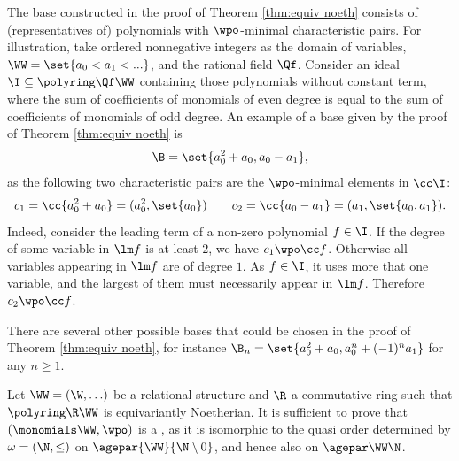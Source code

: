 \begin{slexample} \label{ex:Hilb-thm}
The base constructed in the proof of Theorem \ref{thm:equiv noeth} consists of 
(representatives of) polynomials with $\wpo$-minimal characteristic pairs.
For illustration, 
take ordered nonnegative integers as the domain of variables, $\WW = \set{a_0 < a_1 < ...}$, 
and the rational field $\Qf$. 
Consider an ideal $\I \subseteq \polyring \Qf \WW$ containing those polynomials 
   without constant term, where the sum of coefficients of monomials of even degree 
   is equal to the sum of coefficients of monomials of odd degree.
   An example of a base given by the proof of Theorem \ref{thm:equiv noeth}  is 
   \begin{align*}%
   \B=\set{a_0^2 + a_0, a_0 - a_1},
   \end{align*}
   as the following two characteristic pairs    are the $\wpo$-minimal elements in $\cc \I$:
   \[
   c_1 = \cc{a_0^2 + a_0} = (a_0^2, \set{a_0})  \qquad c_2 = \cc{a_0 - a_1} = (a_1, \set{a_0, a_1}).
   \]
   Indeed, consider the leading term of a non-zero polynomial $f\in \I$.
   If the degree of some variable in $\lm f$ is at least $2$, we have $c_1 \wpo \cc f$.
   Otherwise all variables appearing in $\lm f$ are of degree $1$.
   As $f\in\I$, it uses more that one variable, and the largest of them must necessarily appear 
   in $\lm f$.
   Therefore $c_2 \wpo \cc f$.
   
   There are several other possible bases that could be chosen in the proof of Theorem \ref{thm:equiv noeth},
   for instance
   $\B_n=\set{a_0^2 + a_0, a_0^n + (-1)^n a_1}$ for any $n\geq 1$.
\end{slexample}


Let $\WW = (\W, \ldots)$ be a relational structure and $\R$ a commutative ring such that
$\polyring \R \WW$ is equivariantly Noetherian.
It is sufficient to prove that $(\monomials \WW, \wpo)$ is a \wqo,
as it is isomorphic to the quasi order determined by
$\omega = (\N, \leq)$ on $\agepar{\WW} {\N\setminus 0}$, and hence also on $\agepar \WW \N$.

